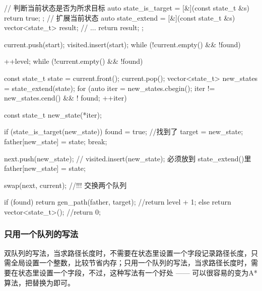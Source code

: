 \begin{Codex}[label=bfs_template1.cpp]
{    // 判断当前状态是否为所求目标
    auto state_is_target = [&](const state_t &s) {return true; };
    // 扩展当前状态
    auto state_extend = [&](const state_t &s) {
        vector<state_t> result;
        // ...
        return result;
    };

    current.push(start);
    visited.insert(start);
    while (!current.empty() && !found) {
        ++level;
        while (!current.empty() && !found) {
            const state_t state = current.front();
            current.pop();
            vector<state_t> new_states = state_extend(state);
            for (auto iter = new_states.cbegin();
                    iter != new_states.cend() && ! found; ++iter) {
                const state_t new_state(*iter);

                if (state_is_target(new_state)) {
                    found = true; //找到了
                    target = new_state;
                    father[new_state] = state;
                    break;
                }

                next.push(new_state);
                // visited.insert(new_state); 必须放到 state_extend()里
                father[new_state] = state;
            }
        }
        swap(next, current); //!!! 交换两个队列
    }

    if (found) {
        return gen_path(father, target);
        //return level + 1;
    } else {
        return vector<state_t>();
        //return 0;
    }
}
\end{Codex}


\subsubsection{只用一个队列的写法}
双队列的写法，当求路径长度时，不需要在状态里设置一个字段记录路径长度，只需全局设置一个整数，比较节省内存；只用一个队列的写法，当求路径长度时，需要在状态里设置一个字段，不过，这种写法有一个好处 —— 可以很容易的变为A*算法，把替换为即可。

